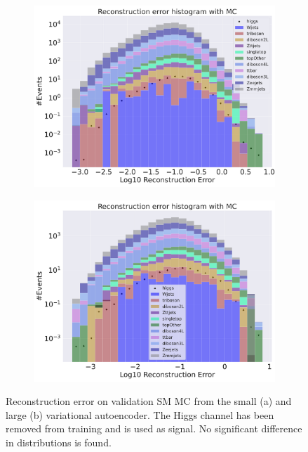 \begin{figure}[H]
    \centering
    \begin{subfigure}{.45\textwidth}
        \includegraphics[width=\textwidth]{Figures/VAE_testing/small/b_data_recon_big_rm3_feats_sig_Higgs.pdf}
        \caption{}
        \label{fig:vae_small_higgs}
    \end{subfigure}
    \hfill 
    \begin{subfigure}{.45\textwidth}
        \includegraphics[width=\textwidth]{Figures/VAE_testing/big/b_data_recon_big_rm3_feats_sig_higgs.pdf}
        \caption{ }
        \label{fig:vae_big_higgs}
    \end{subfigure}
    \hfill  
    \caption[VAE | Reconstruction error using Higgs channel as signal]{Reconstruction error on validation SM MC from the small (a) and large (b) variational autoencoder. The Higgs channel has been removed from training and 
    is used as signal. No significant difference in distributions is found. }
    \label{fig:vae_big_channel_1}
\end{figure}

